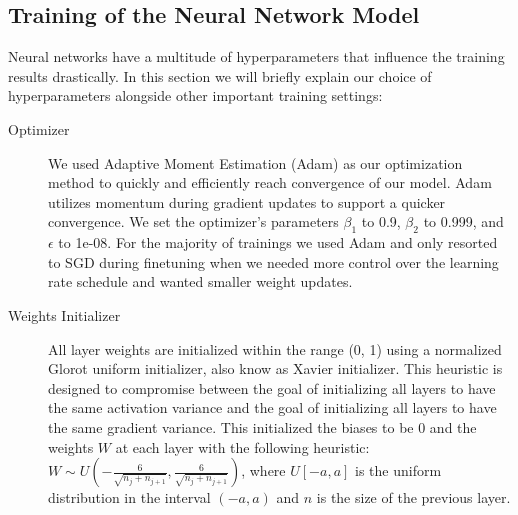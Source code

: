 \subsection{Training of the Neural Network Model} 
\label{sec:training}
	Neural networks have a multitude of hyperparameters that influence the training results drastically. In this section we will briefly explain our choice of hyperparameters alongside other important training settings:

	\begin{description}
	\item[Optimizer] We used Adaptive Moment Estimation (Adam)\cite{kingma2014adam} as our optimization method to quickly and efficiently reach convergence of our model. Adam utilizes momentum during gradient updates to support a quicker convergence. We set the optimizer's parameters $\beta_1$ to 0.9, $\beta_2$ to 0.999, and $\epsilon$ to 1e-08. For the majority of trainings we used Adam and only resorted to SGD during finetuning when we needed more control over the learning rate schedule and wanted smaller weight updates.
	\item[Weights Initializer] All layer weights are initialized within the range (0, 1) using a normalized Glorot uniform initializer\cite{glorot2010understanding}, also know as Xavier initializer. This heuristic is designed to compromise between the goal of initializing all layers to have the same activation variance and the goal of initializing all layers to have the same gradient variance. This initialized the biases to be 0 and the weights $W$ at each layer with the following heuristic\cite[chapter 8.4, p. 303]{Goodfellow-et-al-2016}: $W \sim U (-\frac{6}{\sqrt{n_j + n_{j+1}}}, \frac{6}{\sqrt{n_j + n_{j+1}}})$, where $U[-a, a]$ is the uniform distribution in the interval $(-a, a)$ and $n$ is the size of the previous layer.
	

\end{description}
